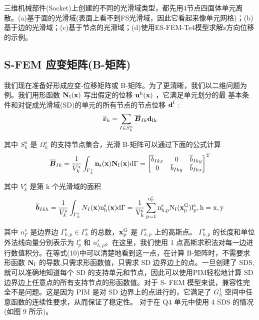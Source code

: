 \documentclass[12pt,a4paper]{article}
\begin{document}
三维机械部件(Socket)上创建的不同的光滑域类型，都先用4节点四面体单元离散。(a)基于面的光滑域(表面上看不到FS光滑域，因此它看起来像单元网格)；(b)基于边的光滑域；(c)基于节点的光滑域；(d)使用ES-FEM-Te4模型求解z方向位移的示例。

\subsection{S-FEM 应变矩阵(B-矩阵)}
我们现在准备好形成应变-位移矩阵或 B-矩阵。为了更清晰，我们以二维问题为例。我们用形函数 $\rm\textbf{N}_I (\rm\textbf{x})$ 写出假定的位移 $\rm\textbf{u}^h (\rm\textbf{x})$ ，它满足单元划分的最
基本条件和对促成光滑域(SD)的单元的所有节点的节点位移 $\rm\textbf{d}^I$ :
\begin{equation}
\overline{\boldsymbol{\varepsilon}}_k =\sum_{I\in S^n_k}\overline{\boldsymbol{B}}_{Ik}\rm\textbf{d}_{Ik}
\end{equation}

其中 $S^n_k$ 是 $\Omega ^s_k$ 的支持节点集合，光滑 B-矩阵可以通过下面的公式计算
\begin{equation}
\overline{\boldsymbol{B}}_{Ik}=\frac{1}{V^s_k}\int_{\Gamma ^s_k}^{} \rm\textbf{n}_s (\rm\textbf{x}) \rm\textbf{N}_I (\rm\textbf{x})\mathrm{d}\Gamma=
\begin{bmatrix}
\overline{b}_{Ikx} & 0 & \overline{b}_{Iky}\\
0 & \overline{b}_{Iky} & \overline{b}_{Ikx}\\
\end{bmatrix}^T
\end{equation}

其中 $V^s_k$ 是第 k 个光滑域的面积
\begin{equation}
\overline{\boldsymbol{b}}_{Ikh}=\frac{1}{V^s_k}\int_{\Gamma ^s_k}^{} N_I (\rm\textbf{x}) n^s_h (\rm\textbf{x})\mathrm{d}\Gamma=
\frac{1}{V^s_k}\sum_{p=1}^{n^s_\Gamma}n^s_{h,p}N_I (\rm\textbf{x}^G_p) l^s_p,h=x,y
\end{equation}

其中 $n^s_{\Gamma}$ 是边界边 $\Gamma ^s_{k,p}\in \Gamma ^s_{k}$ 的总数，$\rm\textbf{x}^G_p$ 是 $\Gamma ^s_{k,p}$ 上的高斯点。 $\Gamma ^s_{k,p}$ 的长度和单位外法线向量分别表示为 $l_p^s$ 和 $n_{h,p}^s$。在这里，我们使用 1 点高斯求积法对每一边进行数值积分。在等式(10)中可以清楚地看到这一点，在计算 B-矩阵时，不需要求形函数 $\rm\textbf{N}_I$ 的导数,只需求形函数值，只需求 SD 边界边上的点。一旦创建了 SDS,就可以准确地知道每个 SD 的支持单元和节点，因此可以使用PIM轻松地计算 SD 边界边上任意点的所有支持节点的形函数值。对于 S-
FEM 模型来说，兼容性完全不是问题。这是因为 PIM 是对 SD 边界上的点进行的，它满足了 $G_h^1$ 空间中任意函数的连续性要求，从而保证了稳定性。
对于在 Q4 单元中使用 4 SDS 的情况(如图 9 所示)。
\end{document}
